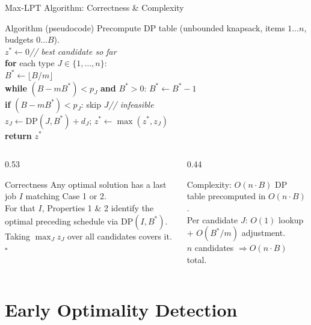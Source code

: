\documentclass[fleqn,11pt,aspectratio=43]{beamer}
\begin{document}
\begin{frame}[shrink=40]{Max-LPT Algorithm: Correctness \& Complexity}
  \begin{block}{Algorithm (pseudocode)}
    \small
    Precompute DP table (unbounded knapsack, items $1\ldots n$, budgets $0\ldots B$).\\[0.2em]
    $z^*\leftarrow 0$\hfill\emph{// best candidate so far}\\
    \textbf{for} each type $J\in\{1,\ldots,n\}$:\\
    \qquad $B^*\leftarrow\lfloor B/m\rfloor$\\
    \qquad \textbf{while} $(B-mB^*)<p_J$ \textbf{and} $B^*>0$:\; $B^*\leftarrow B^*-1$\\
    \qquad \textbf{if} $(B-mB^*)<p_J$: skip $J$\hfill\emph{// infeasible}\\
    \qquad $z_J\leftarrow\mathrm{DP}(J,B^*)+d_J$;\; $z^*\leftarrow\max(z^*,z_J)$\\
    \textbf{return} $z^*$
  \end{block}
  \begin{columns}[T]
    \begin{column}{0.53\textwidth}
      \begin{block}{Correctness}
        \small
        Any optimal solution has a last job $I$ matching Case 1 or 2.\\[0.2em]
        For that $I$, Properties 1 \& 2 identify the optimal preceding schedule via $\mathrm{DP}(I,B^*)$.\\[0.2em]
        Taking $\max_J z_J$ over all candidates covers it.\hfill$\square$
      \end{block}
    \end{column}
    \begin{column}{0.44\textwidth}
      \begin{alertblock}{Complexity: $O(n\cdot B)$}
        \small
        DP table precomputed in $O(n\cdot B)$.\\[0.2em]
        Per candidate $J$: $O(1)$ lookup + $O(B^*/m)$ adjustment.\\[0.2em]
        $n$ candidates $\Rightarrow O(n\cdot B)$ total.
      \end{alertblock}
    \end{column}
  \end{columns}
\end{frame}

\section{Early Optimality Detection}
\end{document}
